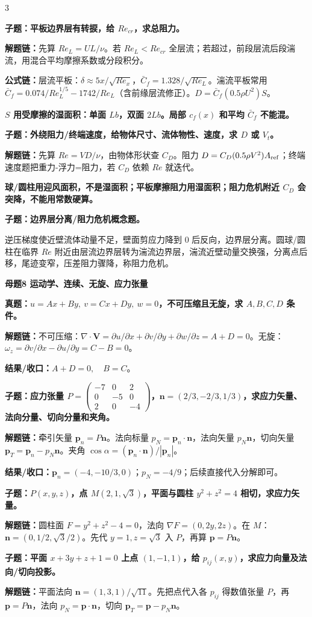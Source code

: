 \documentclass[a4paper]{article}
\newcommand{\mt}[1]{\vspace{2pt}\colorbox{M}{\parbox{\dimexpr\linewidth-2\fboxsep}{\color{white}\bfseries #1}}\par}
\newcommand{\qt}[1]{\vspace{1pt}\colorbox{Q}{\parbox{\dimexpr\linewidth-2\fboxsep}{\color{white}\bfseries #1}}\par}
\newcommand{\ans}[1]{\colorbox{G}{\parbox{\dimexpr\linewidth-2\fboxsep}{#1}}\par}
\newcommand{\warn}[1]{\colorbox{Y}{\parbox{\dimexpr\linewidth-2\fboxsep}{\color{E}\bfseries #1}}\par}
\newcommand{\chain}[1]{{\color{A}\bfseries 解题链：}#1\par}
\newcommand{\res}[1]{{\color{E}\bfseries 结果/收口：}#1\par}
\newcommand{\form}[1]{{\color{M}\bfseries 公式链：}#1\par}
\begin{document}
\begin{multicols}{3}
\qt{子题：平板边界层有转捩，给 $Re_{cr}$，求总阻力。}
\chain{先算 $Re_L=UL/\nu$。若 $Re_L<Re_{cr}$ 全层流；若超过，前段层流后段湍流，用混合平均摩擦系数或分段积分。}
\form{层流平板：$\delta\approx5x/\sqrt{Re_x}$，$\bar C_f=1.328/\sqrt{Re_L}$。湍流平板常用 $\bar C_f=0.074/Re_L^{1/5}-1742/Re_L$（含前缘层流修正）。$D=\bar C_f(0.5\rho U^2)S$。}
\warn{$S$ 用受摩擦的湿面积：单面 $Lb$，双面 $2Lb$。局部 $c_f(x)$ 和平均 $\bar C_f$ 不能混。}

\qt{子题：外绕阻力/终端速度，给物体尺寸、流体物性、速度，求 $D$ 或 $V_t$。}
\chain{先算 $Re=VD/\nu$，由物体形状查 $C_D$。阻力 $D=C_D(0.5\rho V^2)A_{\rm ref}$；终端速度题把重力-浮力=阻力，若 $C_D$ 依赖 $Re$ 就迭代。}
\warn{球/圆柱用迎风面积，不是湿面积；平板摩擦阻力用湿面积；阻力危机附近 $C_D$ 会突降，不能用常数硬算。}

\qt{子题：边界层分离/阻力危机概念题。}
\ans{逆压梯度使近壁流体动量不足，壁面剪应力降到 0 后反向，边界层分离。圆球/圆柱在临界 $Re$ 附近由层流边界层转为湍流边界层，湍流近壁动量交换强，分离点后移，尾迹变窄，压差阻力骤降，称阻力危机。}

\mt{母题8 运动学、连续、无旋、应力张量}
\qt{真题：$u=Ax+By,\ v=Cx+Dy,\ w=0$，不可压缩且无旋，求 $A,B,C,D$ 条件。}
\chain{不可压缩：$\nabla\cdot\bm V=\partial u/\partial x+\partial v/\partial y+\partial w/\partial z=A+D=0$。无旋：$\omega_z=\partial v/\partial x-\partial u/\partial y=C-B=0$。}
\res{$A+D=0,\quad B=C$。}

\qt{子题：应力张量 $P=\begin{pmatrix}-7&0&2\\0&-5&0\\2&0&-4\end{pmatrix}$，$\bm n=(2/3,-2/3,1/3)$，求应力矢量、法向分量、切向分量和夹角。}
\chain{牵引矢量 $\bm p_n=P\bm n$。法向标量 $p_N=\bm p_n\cdot\bm n$，法向矢量 $p_N\bm n$，切向矢量 $\bm p_T=\bm p_n-p_N\bm n$。夹角 $\cos\alpha=(\bm p_n\cdot\bm n)/|\bm p_n|$。}
\res{$\bm p_n=(-4,-10/3,0)$；$p_N=-4/9$；后续直接代入分解即可。}

\qt{子题：$P(x,y,z)$，点 $M(2,1,\sqrt3)$，平面与圆柱 $y^2+z^2=4$ 相切，求应力矢量。}
\chain{圆柱面 $F=y^2+z^2-4=0$，法向 $\nabla F=(0,2y,2z)$。在 $M$：$\bm n=(0,1/2,\sqrt3/2)$。先代 $y=1,z=\sqrt3$ 入 $P$，再算 $\bm p=P\bm n$。}

\qt{子题：平面 $x+3y+z+1=0$ 上点 $(1,-1,1)$，给 $p_{ij}(x,y)$，求应力向量及法向/切向投影。}
\chain{平面法向 $\bm n=(1,3,1)/\sqrt{11}$。先把点代入各 $p_{ij}$ 得数值张量 $P$，再 $\bm p=P\bm n$，法向 $p_N=\bm p\cdot\bm n$，切向 $\bm p_T=\bm p-p_N\bm n$。}


\end{multicols}
\end{document}
